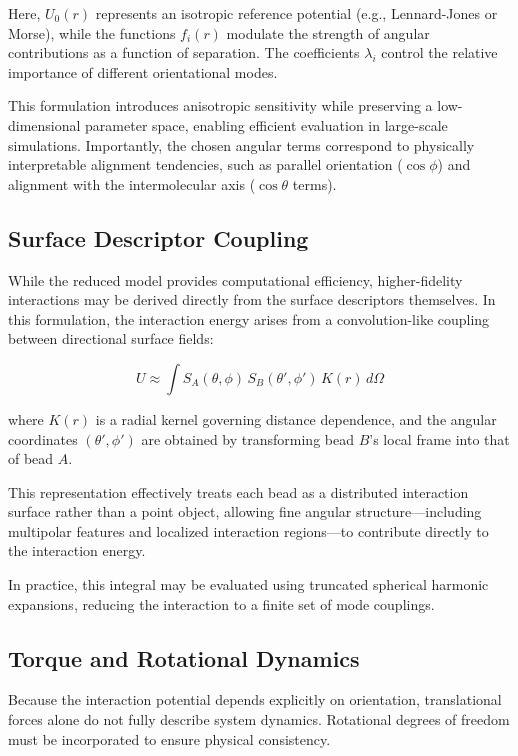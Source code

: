 \documentclass[11pt]{article}
\begin{document}
Here, $U_0(r)$ represents an isotropic reference potential (e.g., Lennard-Jones or Morse), while the functions $f_i(r)$ modulate the strength of angular contributions as a function of separation. The coefficients $\lambda_i$ control the relative importance of different orientational modes.

This formulation introduces anisotropic sensitivity while preserving a low-dimensional parameter space, enabling efficient evaluation in large-scale simulations. Importantly, the chosen angular terms correspond to physically interpretable alignment tendencies, such as parallel orientation ($\cos\phi$) and alignment with the intermolecular axis ($\cos\theta$ terms).

\subsection{Surface Descriptor Coupling}

While the reduced model provides computational efficiency, higher-fidelity interactions may be derived directly from the surface descriptors themselves. In this formulation, the interaction energy arises from a convolution-like coupling between directional surface fields:

\begin{equation}
U \approx \int S_A(\theta,\phi)\, S_B(\theta',\phi')\, K(r)\, d\Omega
\end{equation}

where $K(r)$ is a radial kernel governing distance dependence, and the angular coordinates $(\theta',\phi')$ are obtained by transforming bead $B$'s local frame into that of bead $A$.

This representation effectively treats each bead as a distributed interaction surface rather than a point object, allowing fine angular structure---including multipolar features and localized interaction regions---to contribute directly to the interaction energy.

In practice, this integral may be evaluated using truncated spherical harmonic expansions, reducing the interaction to a finite set of mode couplings.

\subsection{Torque and Rotational Dynamics}

Because the interaction potential depends explicitly on orientation, translational forces alone do not fully describe system dynamics. Rotational degrees of freedom must be incorporated to ensure physical consistency.
\end{document}
